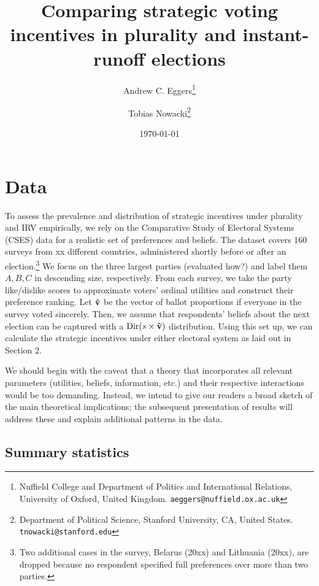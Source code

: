 \documentclass[11pt, letter]{article}
\begin{document}
\author{Andrew C. Eggers\thanks{Nuffield College and Department of Politics and International Relations, University of Oxford, United Kingdom. \texttt{aeggers@nuffield.ox.ac.uk}}
\and
Tobias Nowacki\thanks{Department of Political Science, Stanford University, CA, United States. \texttt{tnowacki@stanford.edu}}}
\date{\today}
\title{Comparing strategic voting incentives in plurality and instant-runoff elections}

\maketitle

\onehalfspacing %

\section{Data}

To assess the prevalence and distribution of strategic incentives under plurality and IRV empirically, we rely on the Comparative Study of Electoral Systems (CSES) data for a realistic set of preferences and beliefs. The dataset covers 160 surveys from xx different countries, administered shortly before or after an election.\footnote{Two additional cases in the survey, Belarus (20xx) and Lithuania (20xx), are dropped because no respondent specified full preferences over more than two parties.} We focus on the three largest parties (evaluated how?) and label them $A, B, C$ in descending size, respectively. From each survey, we take the party like/dislike scores to approximate voters' ordinal utilities and construct their preference ranking. Let $\bf \tilde{v}$ be the vector of ballot proportions if everyone in the survey voted sincerely. Then, we assume that respondents' beliefs about the next election can be captured with a $\text{Dir}(s \times \bf \tilde{v})$ distribution. Using this set up, we can calculate the strategic incentives under either electoral system as laid out in Section 2.

We should begin with the caveat that a theory that incorporates all relevant parameters (utilities, beliefs, information, etc.) and their respective interactions would be too demanding. Instead, we intend to give our readers a broad sketch of the main theoretical implications; the subsequent presentation of results will address these and explain additional patterns in the data.

\subsection{Summary statistics}
\end{document}
